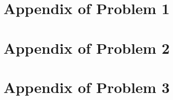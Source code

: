 \chapter{Appendix of Problem 1}\label{app:shadow-dexterous-hand-technical-specifications}

\chapter{Appendix of Problem 2}\label{app:tactile-perception-simulated-electrode-activations}

\chapter{Appendix of Problem 3}\label{app:pose-estimation-weight-convergence}
